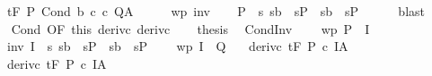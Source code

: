 \begin{isabellebody}
\ \ \ {\isachardoublequoteopen}{\isasymGamma}{\isacharcomma}{\isasymTheta}{\isasymturnstile}\isactrlsub t\isactrlbsub {\isacharslash}F\isactrlesub \ P\ {\isacharparenleft}Cond\ b\ c\ c\ Q{\isacharcomma}A{\isachardoublequoteclose}\isanewline
%
\isadelimproof
%
\endisadelimproof
%
\isatagproof
{}\isamarkupfalse%
\ {\isacharminus}\isanewline
\ \ \isamarkupfalse%
\ wp\ inv\isanewline
\ \ \isamarkupfalse%
\ {\isachardoublequoteopen}P\ {\isasymsubseteq}\ {\isacharbraceleft}s{\isachardot}\ {\isacharparenleft}s{\isasymin}b\ {\isasymlongrightarrow}\ s{\isasymin}P\ {\isasymand}\ {\isacharparenleft}s{\isasymnotin}b\ {\isasymlongrightarrow}\ s{\isasymin}P\isanewline
\ \ \ \ \isamarkupfalse%
\ blast\isanewline
\ \ \isamarkupfalse%
\ Cond\ {\isacharbrackleft}OF\ this\ deriv{\isacharunderscore}c{}\ deriv{\isacharunderscore}c{}{\isacharbrackright}\isanewline
\ \ \isamarkupfalse%
\ {\isacharquery}thesis\ \isacommand{{\isachardot}}\isamarkupfalse%
\isanewline
{}\isamarkupfalse%
%
\endisatagproof
{\isafoldproof}%
%
\isadelimproof
\isanewline
%
\endisadelimproof
\isanewline
{}\isamarkupfalse%
\ CondInv{\isacharprime}{\isacharcolon}\ \isanewline
\ \ \ wp{\isacharcolon}\ {\isachardoublequoteopen}P\ {\isasymsubseteq}\ I{\isachardoublequoteclose}\ \isanewline
\ \ \ inv{\isacharcolon}\ {\isachardoublequoteopen}I\ {\isasymsubseteq}\ {\isacharbraceleft}s{\isachardot}\ {\isacharparenleft}s{\isasymin}b\ {\isasymlongrightarrow}\ s{\isasymin}P\ {\isasymand}\ {\isacharparenleft}s{\isasymnotin}b\ {\isasymlongrightarrow}\ s{\isasymin}P\ \isanewline
\ \ \ wp{\isacharprime}{\isacharcolon}\ {\isachardoublequoteopen}I\ {\isasymsubseteq}\ Q{\isachardoublequoteclose}\isanewline
\ \ \ deriv{\isacharunderscore}c{}{\isacharcolon}\ {\isachardoublequoteopen}{\isasymGamma}{\isacharcomma}{\isasymTheta}{\isasymturnstile}\isactrlsub t\isactrlbsub {\isacharslash}F\isactrlesub \ P\ c\ I{\isacharcomma}A{\isachardoublequoteclose}\ \isanewline
\ \ \ deriv{\isacharunderscore}c{}{\isacharcolon}\ {\isachardoublequoteopen}{\isasymGamma}{\isacharcomma}{\isasymTheta}{\isasymturnstile}\isactrlsub t\isactrlbsub {\isacharslash}F\isactrlesub \ P\ c\ I{\isacharcomma}A{\isachardoublequoteclose}\isanewline

\end{isabellebody}
